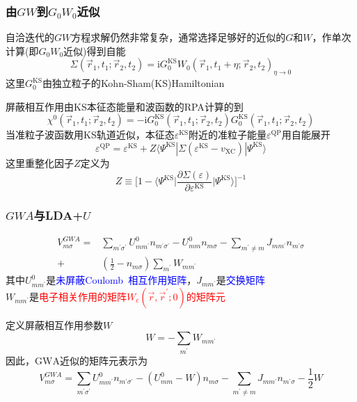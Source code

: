 \documentclass[cjk,slidestop,compress,mathserif,blue]{beamer}
\begin{document}
\frame
{
	\frametitle{由$GW$到$G_0W_0$近似}
	自洽迭代的$GW$方程求解仍然非常复杂，通常选择足够好的近似的$G$和$W$，作单次计算(即$G_0W_0$近似)得到自能
	$$\Sigma(\vec r_1,t_1;\vec r_2,t_2)=\mathrm{i}G_0^{\mathrm{KS}}W_0(\vec r_1,t_1+\eta;\vec r_2,t_2)_{\eta\rightarrow0}$$
	这里$G_0^{\mathrm{KS}}$由独立粒子的\textrm{Kohn-Sham(KS)}Hamiltonian

	屏蔽相互作用由\textrm{KS}本征态能量和波函数的\textrm{RPA}计算的到
	$$\chi^0(\vec r_1,t_1;\vec r_2,t_2)=-\mathrm{i}G_0^{\mathrm{KS}}(\vec r_1,t_1;\vec r_2,t_2)G_0^{\mathrm{KS}}(\vec r_1,t_1;\vec r_2,t_2)$$
	当准粒子波函数用\textrm{KS}轨道近似，本征态$\varepsilon^{\mathrm{KS}}$附近的准粒子能量$\varepsilon^{\mathrm{QP}}$用自能展开
	$$\varepsilon^{\mathrm{QP}}=\varepsilon^{\mathrm{KS}}+Z\langle\Psi^{\mathrm{KS}}|\Sigma(\varepsilon^{\mathrm{KS}}-v_{\mathrm{XC}})|\Psi^{\mathrm{KS}}\rangle$$
	这里重整化因子$Z$定义为$$Z\equiv\bigg[1-\langle\Psi^{\mathrm{KS}}\bigg|\dfrac{\partial\Sigma(\varepsilon)}{\partial\varepsilon^{\mathrm{KS}}}\bigg|\Psi^{\mathrm{KS}}\rangle\bigg]^{-1}$$
}

\frame
{
	\frametitle{$GWA$与\textrm{LDA+}$U$}
	\begin{displaymath}
		\begin{aligned}
			V_{m\sigma}^{GWA}=&\sum_{m^{\prime}\sigma^{\prime}}U_{mm^{\prime}}^0n_{m^{\prime}\sigma^{\prime}}-U_{mm}^0n_{m\sigma}-\sum_{m^{\prime}\neq m}J_{mm^{\prime}}n_{m^{\prime}\sigma}\\
			+&\left( \frac12-n_{m\sigma} \right)\sum_{m^{\prime}}W_{mm^{\prime}}
		\end{aligned}
	\end{displaymath}
	其中$U_{mm^{\prime}}^0$是\textcolor{blue}{未屏蔽\textrm{Coulomb~}相互作用矩阵}，$J_{mm^{\prime}}$是\textcolor{blue}{交换矩阵}\\
	$W_{mm^{\prime}}$是\textcolor{red}{电子相关作用的矩阵$W_{\mathrm c}(\vec r,\vec r^{\prime};0)$的矩阵元}

	定义屏蔽相互作用参数$W$
	\begin{displaymath}
		W=-\sum_{m^{\prime}}W_{mm^{\prime}}
	\end{displaymath}
	因此，$\mathrm{GWA}$近似的矩阵元表示为
	\begin{displaymath}
			V_{m\sigma}^{GWA}=\sum_{m^{\prime}\sigma^{\prime}}U_{mm^{\prime}}^0n_{m^{\prime}\sigma^{\prime}}-(U_{mm}^0-W)n_{m\sigma}-\sum_{m^{\prime}\neq m}J_{mm^{\prime}}n_{m^{\prime}\sigma}-\frac12W
	\end{displaymath}
}
\end{document}
